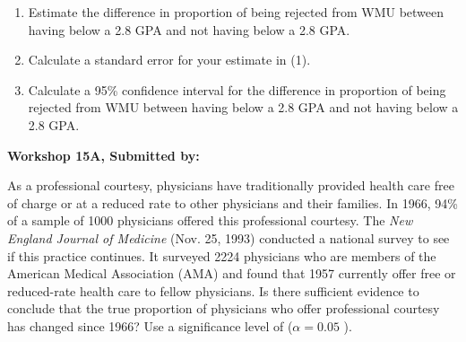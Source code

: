 \documentclass[11pt]{book}\usepackage[]{graphicx}\usepackage[]{color}
\begin{document}
\begin{exercises}
\begin{exercise}
\begin{enumerate}
  \item Estimate the difference in proportion of being rejected from WMU between having below a 2.8 GPA and not having below a 2.8 GPA.
  \item Calculate a standard error for your estimate in (1).
  \item Calculate a 95\% confidence interval for the difference in proportion of being rejected from WMU between having below a 2.8 GPA and not having below a 2.8 GPA.
\end{enumerate}

\end{exercise}
\begin{solution}  %

\end{solution}

\clearpage

    \begin{exercise}  %

    \begin{center}
\begin{flushleft}\textbf{\large \hfill Workshop 15A, Submitted by: }\end{flushleft}

\end{center}


As a professional courtesy, physicians have traditionally provided health care free of charge or at a reduced rate to other physicians and their families. In 1966, 94\% of a sample of 1000 physicians offered this professional courtesy. The \textit{New England Journal of Medicine} (Nov. 25, 1993) conducted a national survey to see if this practice continues. It surveyed 2224 physicians who are members of the American Medical Association (AMA) and found that 1957 currently offer free or reduced-rate health care to fellow physicians. Is there sufficient evidence to conclude that the true proportion of physicians who offer professional courtesy has changed since 1966? Use a significance level of ($\alpha = 0.05$ ).


\end{exercise}
\end{exercises}
\end{document}
